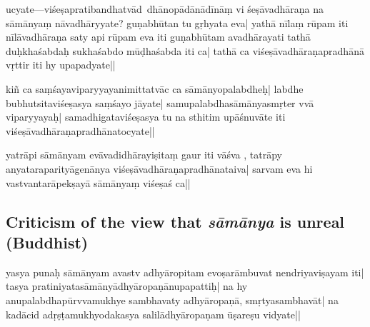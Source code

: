ucyate---viśeṣapratibandhatvād\mde\ dhāno\-pādān\mds ādī\mde nāṃ vi\mds 
śeṣāvadhāraṇa%
na sāmānyaṃ nāvadhāryyate? guṇabhūtan tu gṛhyata eva| yathā nīlaṃ rūpam iti 
nīl\mde āvadhāraṇa 
saty api rūpam eva  
iti guṇabhūtam a\mds vadhārayati tathā duḥkhaśabdaḥ sukhaśabdo mūḍhaśabda i\mde ti ca| \mds 
tathā ca viśeṣāvadhāraṇapradhānā vṛttir iti hy upapadyate||

kiñ ca saṃśayaviparyyayanimittatvāc ca sāmānyopalabdheḥ| %
%
labdhe bubhutsitaviśeṣasya saṃśayo jā\mds yate| 
samupalabdhasāmānyasmṛter vvā viparyyayaḥ| samadhigataviśeṣasya tu  na sthitim 
upā\-śnuvāte iti viśeṣāva\mde dhāraṇapradh\mds ānatocyate||

yatrāpi sāmānyam evāvadidhārayiṣitaṃ gaur iti vāśva %
, tatrāpy anyata\-ra\-parityāgenānya %
viśeṣāvadhāraṇapradhānataiva| sarvam e\-va hi  
vastvantarāpekṣayā sāmānyaṃ viśeṣaś ca||

\subsection{Criticism of the view that \emph{sāmānya} is unreal (Buddhist)}
yasya punaḥ sāmānyam avastv adhyāropitam evoṣarāmbuvat nendriyaviṣayam iti|
tasya pratiniyata\-sāmānyā\-dhyā\-ropaṇā\-nupapattiḥ| na hy anupala\mde bdhapū\-rvvamu\mds khye \mde sambhava\mds ty adhyāropaṇā, smṛtyasambhavāt| 
na kadācid adṛṣṭamukhyodakasya salilā\-dhyā\-ropaṇam ūṣareṣu vidyate||

